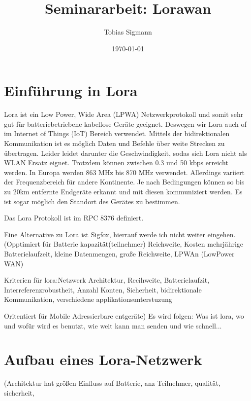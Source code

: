 \documentclass[a4paper,12pt]{article}
\author{Tobias Sigmann}
\title{Seminararbeit: Lorawan}
\date{\today}
\begin{document}
    \maketitle
    \tableofcontents
    \newpage
    \begin{abstract} 
       \cite{WhatIsLoRa}
       \newline
       \cite{Semtech}
    \end{abstract}

    \section{Einführung in Lora}
    Lora ist ein Low Power, Wide Area (LPWA) Netzwerkprotokoll und somit sehr gut für batteriebetriebene kabellose Geräte geeignet. Deswegen wir Lora auch of im Internet of Things (IoT) Bereich verwendet.
    Mittels der bidirektionalen Kommunikation ist es möglich Daten und Befehle über weite Strecken zu übertragen. Leider leidet darunter die Geschwindigkeit, sodas sich Lora nicht als WLAN Ersatz eignet.
    Trotzdem können zwischen 0.3 und 50 kbps erreicht werden. In Europa werden 863 MHz bis 870 MHz verwendet. Allerdings variiert der Frequenzbereich für andere Kontinente. Je nach Bedingungen können so bis zu 20km entfernte Endgeräte erkannt und mit diesen kommuniziert werden.
    Es ist sogar möglich den Standort des Gerätes zu bestimmen.

    Das Lora Protokoll ist im RPC 8376 definiert.
    
    Eine Alternative zu Lora ist Sigfox, hierrauf werde ich nicht weiter eingehen.
    \newline    
    \cite{WhatIsLoRa}(Opptimiert für Batterie kapazität(teilnehmer) Reichweite, Kosten
    mehrjährige Batterielaufzeit, kleine Datenmengen, große Reichweite, LPWAn (LowPower WAN)
    
    Kriterien für lora:Netzwerk Architektur, Recihweite, Batterielaufzit, Interreferenzrobustheit, Anzahl Konten, Sicherheit, bidirektionale Kommunikation, verschiedene applikationsunterstuzung
    
    Oritentiert für Mobile Adressierbare entgeräte)
        \cite{LoraLimit}
    \newline{}\newline{} Es wird folgen: Was ist lora, wo und wofür wird es benutzt, wie weit kann man senden und wie schnell...
    \section{Aufbau eines Lora-Netzwerk}
    \cite{WhatIsLoRa}(Architektur hat größen Einfluss auf Batterie, anz Teilnehmer, qualität, sicherheit,
    
\end{document}
